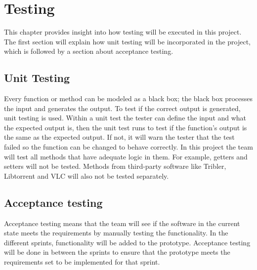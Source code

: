 \chapter{Testing}
\thispagestyle{fancy}
\label{sec:test}
This chapter provides insight into how testing will be executed in this project. The first section will explain how unit testing will be incorporated  in the project, which is followed by a section about acceptance testing.

\section{Unit Testing}
Every function or method can be modeled as a black box; the black box processes the input and generates the output. To test if the correct output is generated, unit testing is used. Within a unit test the tester can define the input and what the expected output is, then the unit test runs to test if the function's output is the same as the expected output. If not, it will warn the tester that the test failed so the function can be changed to behave correctly. 
In this project the team will test all methods that have adequate logic in them. For example, getters and setters will not be tested. Methods from third-party software like Tribler, Libtorrent and VLC will also not be tested separately. 

\section{Acceptance testing}
Acceptance testing means that the team will see if the software in the current state meets the requirements by manually testing the functionality. In the different sprints, functionality will be added to the prototype. Acceptance testing will be done in between the sprints to ensure that the prototype meets the requirements set to be implemented for that sprint.